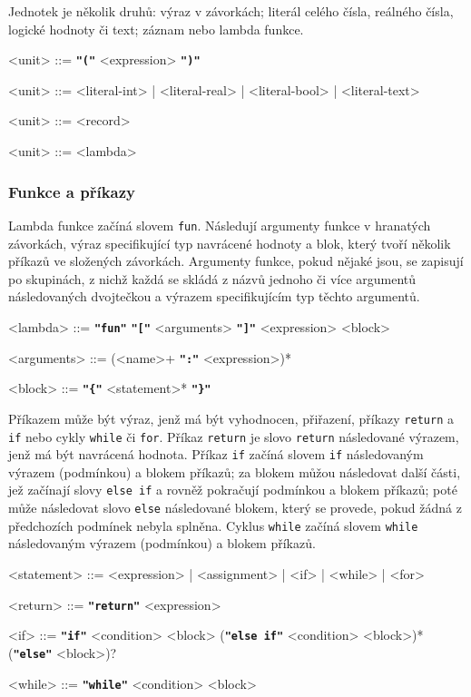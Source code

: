 \documentclass[a4paper,12pt]{article}
\def\quote #1{"#1"}
\def\emphasis #1{\textbf{\texttt{\quote{#1}}}}
\begin{document}
Jednotek je několik druhů: výraz v závorkách; literál celého čísla, reálného čísla, logické hodnoty či text; záznam nebo lambda funkce.
\begin{grammar}
<unit> ::= \emphasis{(} <expression> \emphasis{)}

<unit> ::= <literal-int> | <literal-real> | <literal-bool> | <literal-text>

<unit> ::= <record>

<unit> ::= <lambda>
\end{grammar}

\subsubsection{Funkce a příkazy}
Lambda funkce začíná slovem \texttt{fun}. Následují argumenty funkce v hranatých závorkách, výraz specifikující typ navrácené hodnoty a blok, který tvoří několik příkazů ve složených závorkách. Argumenty funkce, pokud nějaké jsou, se zapisují po skupinách, z nichž každá se skládá z názvů jednoho či více argumentů následovaných dvojtečkou a výrazem specifikujícím typ těchto argumentů.
\begin{grammar}
<lambda> ::= \emphasis{fun} \emphasis{[} <arguments> \emphasis{]} <expression> <block>

<arguments> ::= (<name>+ \emphasis{:} <expression>)*

<block> ::= \emphasis{\{} <statement>* \emphasis{\}}
\end{grammar}

Příkazem může být výraz, jenž má být vyhodnocen, přiřazení, příkazy \texttt{return} a \texttt{if} nebo cykly \texttt{while} či \texttt{for}. Příkaz \texttt{return} je slovo \texttt{return} následované výrazem, jenž má být navrácená hodnota. Příkaz \texttt{if} začíná slovem \texttt{if} následovaným výrazem (podmínkou) a blokem příkazů; za blokem můžou následovat další části, jež začínají slovy \texttt{else if} a rovněž pokračují podmínkou a blokem příkazů; poté může následovat slovo \texttt{else} následované blokem, který se provede, pokud žádná z předchozích podmínek nebyla splněna. Cyklus \texttt{while} začíná slovem \texttt{while} následovaným výrazem (podmínkou) a blokem příkazů.
\begin{grammar}
<statement> ::= <expression> | <assignment> | <if> | <while> | <for>

<return> ::= \emphasis{return} <expression>

<if> ::= \emphasis{if} <condition> <block> (\emphasis{else if} <condition> <block>)* (\emphasis{else} <block>)?

<while> ::= \emphasis{while} <condition> <block>
\end{grammar}
\end{document}
